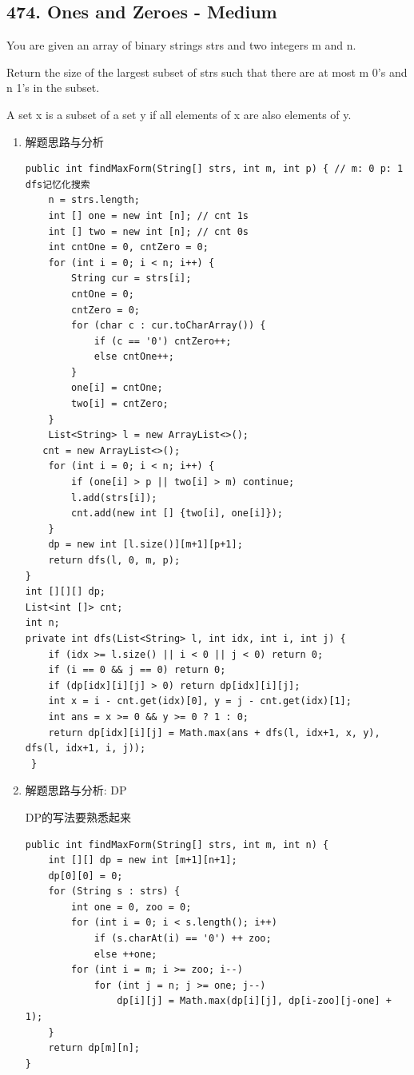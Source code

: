 \documentclass[9pt, b5paaper]{book}
\begin{document}
\subsection{474. Ones and Zeroes - Medium}
\label{sec-1-0-7}
You are given an array of binary strings strs and two integers m and n.

Return the size of the largest subset of strs such that there are at most m 0's and n 1's in the subset.

A set x is a subset of a set y if all elements of x are also elements of y.
\begin{enumerate}
\item 解题思路与分析
\label{sec-1-0-7-1}
\begin{verbatim}
public int findMaxForm(String[] strs, int m, int p) { // m: 0 p: 1 dfs记忆化搜索
    n = strs.length;
    int [] one = new int [n]; // cnt 1s
    int [] two = new int [n]; // cnt 0s
    int cntOne = 0, cntZero = 0;
    for (int i = 0; i < n; i++) {
        String cur = strs[i];
        cntOne = 0;
        cntZero = 0;
        for (char c : cur.toCharArray()) {
            if (c == '0') cntZero++;
            else cntOne++;
        }
        one[i] = cntOne;
        two[i] = cntZero;
    }
    List<String> l = new ArrayList<>();
   cnt = new ArrayList<>();
    for (int i = 0; i < n; i++) {
        if (one[i] > p || two[i] > m) continue;
        l.add(strs[i]);
        cnt.add(new int [] {two[i], one[i]});
    }
    dp = new int [l.size()][m+1][p+1];
    return dfs(l, 0, m, p);
}
int [][][] dp;
List<int []> cnt;
int n;
private int dfs(List<String> l, int idx, int i, int j) { 
    if (idx >= l.size() || i < 0 || j < 0) return 0;
    if (i == 0 && j == 0) return 0;
    if (dp[idx][i][j] > 0) return dp[idx][i][j];
    int x = i - cnt.get(idx)[0], y = j - cnt.get(idx)[1];
    int ans = x >= 0 && y >= 0 ? 1 : 0;
    return dp[idx][i][j] = Math.max(ans + dfs(l, idx+1, x, y), dfs(l, idx+1, i, j));
 }
\end{verbatim}
\item 解题思路与分析: DP
\label{sec-1-0-7-2}

DP的写法要熟悉起来

\begin{verbatim}
public int findMaxForm(String[] strs, int m, int n) {
    int [][] dp = new int [m+1][n+1];
    dp[0][0] = 0;
    for (String s : strs) {
        int one = 0, zoo = 0;
        for (int i = 0; i < s.length(); i++) 
            if (s.charAt(i) == '0') ++ zoo;
            else ++one;
        for (int i = m; i >= zoo; i--) 
            for (int j = n; j >= one; j--) 
                dp[i][j] = Math.max(dp[i][j], dp[i-zoo][j-one] + 1);
    }
    return dp[m][n];
}
\end{verbatim}
\end{enumerate}
\end{document}
